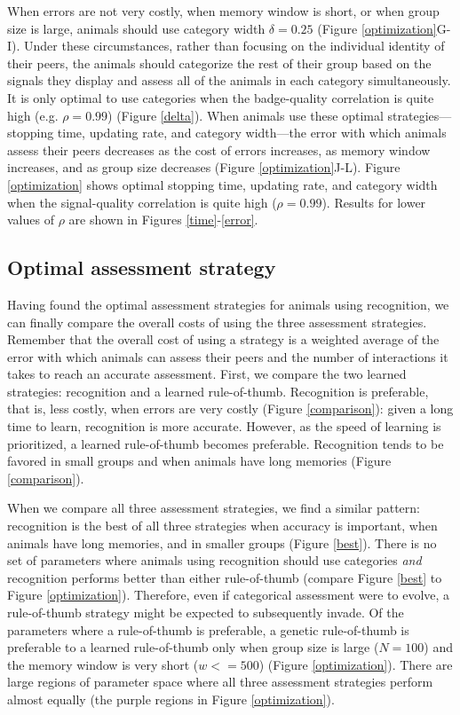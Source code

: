 When errors are not very costly, when memory window is short, or when group size is large, animals should use category width $\delta=0.25$ (Figure \ref{optimization}G-I). Under these circumstances, rather than focusing on the individual identity of their peers, the animals should categorize the rest of their group based on the signals they display and assess all of the animals in each category simultaneously. It is only optimal to use categories when the badge-quality correlation is quite high (e.g. $\rho=0.99$) (Figure \ref{delta}). When animals use these optimal strategies---stopping time, updating rate, and category width---the error with which animals assess their peers decreases as the cost of errors increases, as memory window increases, and as group size decreases (Figure \ref{optimization}J-L). Figure \ref{optimization} shows optimal stopping time, updating rate, and category width when the signal-quality correlation is quite high ($\rho=0.99$). Results for lower values of $\rho$ are shown in Figures \ref{time}-\ref{error}.

\subsection*{Optimal assessment strategy}
Having found the optimal assessment strategies for animals using recognition, we can finally compare the overall costs of using the three assessment strategies. Remember that the overall cost of using a strategy is a weighted average of the error with which animals can assess their peers and the number of interactions it takes to reach an accurate assessment. First, we compare the two learned strategies: recognition and a learned rule-of-thumb. Recognition is preferable, that is, less costly, when errors are very costly (Figure \ref{comparison}): given a long time to learn, recognition is more accurate. However, as the speed of learning is prioritized, a learned rule-of-thumb becomes preferable. Recognition tends to be favored in small groups and when animals have long memories (Figure \ref{comparison}).

When we compare all three assessment strategies, we find a similar pattern: recognition is the best of all three strategies when accuracy is important, when animals have long memories, and in smaller groups (Figure \ref{best}). There is no set of parameters where animals using recognition should use categories \emph{and} recognition performs better than either rule-of-thumb (compare Figure \ref{best} to Figure \ref{optimization}). Therefore, even if categorical assessment were to evolve, a rule-of-thumb strategy might be expected to subsequently invade. Of the parameters where a rule-of-thumb is preferable, a genetic rule-of-thumb is preferable to a learned rule-of-thumb only when group size is large ($N=100$) and the memory window is very short ($w<=500$) (Figure \ref{optimization}). There are large regions of parameter space where all three assessment strategies perform almost equally (the purple regions in Figure \ref{optimization}).

